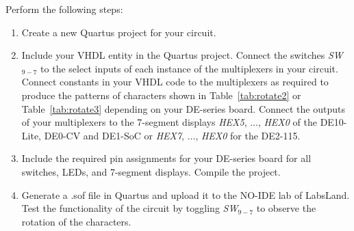 \documentclass[epsfig,10pt,fullpage]{article}
\newcommand{\CommonDocsPath}{../../../common/docs}
\begin{document}
Perform the following steps:
\begin{enumerate}
\item Create a new Quartus  project for your circuit.
\item Include your VHDL entity in the Quartus  project. Connect the switches 
{\it SW}$_{9-7}$ to the select inputs of each instance of the 
multiplexers in your circuit. Connect constants in your VHDL code to the multiplexers 
as required to produce the patterns of characters shown in Table~\ref{tab:rotate2} or 
Table~\ref{tab:rotate3} depending on your DE-series board.
Connect the outputs of your multiplexers to the 7-segment displays {\it HEX5}, $\ldots$, 
{\it HEX0} of the DE10-Lite, DE0-CV and DE1-SoC or {\it HEX7}, $\ldots$, 
{\it HEX0} for the DE2-115.
\item Include the required pin assignments for your DE-series board for all switches, LEDs, 
and 7-segment displays. Compile the project.
\item Generate a .sof file in Quartus and upload it to the NO-IDE lab of LabsLand. Test the functionality of the 
circuit by toggling {\it SW}$_{9-7}$ to observe the rotation of the characters.
\end{enumerate}



\end{document}
